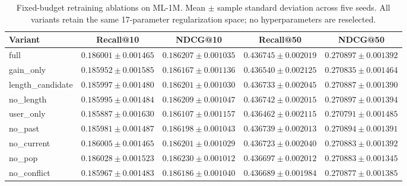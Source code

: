 \begin{table}[t]
\centering\footnotesize
\setlength{\tabcolsep}{4pt}
\caption{Fixed-budget retraining ablations on ML-1M. Mean $\pm$ sample standard deviation across five seeds. All variants retain the same 17-parameter regularization space; no hyperparameters are reselected.}
\label{tab:fafirec-ablation-v5}
\begin{tabular}{lcccc}
\hline
Variant & Recall@10 & NDCG@10 & Recall@50 & NDCG@50 \\
\hline
full & $0.186001 \pm 0.001465$ & $0.186207 \pm 0.001035$ & $0.436745 \pm 0.002019$ & $0.270897 \pm 0.001392$ \\
gain\_only & $0.185952 \pm 0.001585$ & $0.186167 \pm 0.001136$ & $0.436540 \pm 0.002125$ & $0.270835 \pm 0.001464$ \\
length\_candidate & $0.185997 \pm 0.001480$ & $0.186201 \pm 0.001030$ & $0.436733 \pm 0.002045$ & $0.270887 \pm 0.001390$ \\
no\_length & $0.185995 \pm 0.001484$ & $0.186209 \pm 0.001047$ & $0.436742 \pm 0.002015$ & $0.270897 \pm 0.001394$ \\
user\_only & $0.185887 \pm 0.001630$ & $0.186107 \pm 0.001157$ & $0.436462 \pm 0.002115$ & $0.270791 \pm 0.001485$ \\
no\_past & $0.185981 \pm 0.001487$ & $0.186198 \pm 0.001043$ & $0.436739 \pm 0.002013$ & $0.270894 \pm 0.001391$ \\
no\_current & $0.186005 \pm 0.001465$ & $0.186201 \pm 0.001029$ & $0.436723 \pm 0.002040$ & $0.270883 \pm 0.001392$ \\
no\_pop & $0.186028 \pm 0.001523$ & $0.186230 \pm 0.001012$ & $0.436697 \pm 0.002012$ & $0.270883 \pm 0.001345$ \\
no\_conflict & $0.185967 \pm 0.001483$ & $0.186186 \pm 0.001040$ & $0.436689 \pm 0.001984$ & $0.270877 \pm 0.001385$ \\
\hline
\end{tabular}
\end{table}
